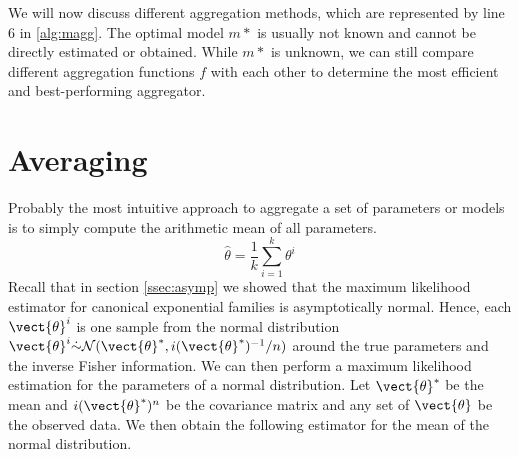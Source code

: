 We will now discuss different aggregation methods, which are represented by line 6 in \alg \ref{alg:magg}.
The optimal model $m*$ is usually not known and cannot be directly estimated or obtained.
While  $m*$ is unknown, we can still compare different aggregation functions $f$ with each other to determine the most efficient and best-performing aggregator.


\section{Averaging}

Probably the most intuitive approach to aggregate a set of parameters or models is to simply compute the  arithmetic mean of all parameters.
\begin{equation}
    \label{eq:arithmean}
    \hat{\theta} = \frac{1}{k} \sum_{i=1}^k \theta^i
\end{equation}
Recall that in section \ref{ssec:asymp} we showed that the maximum likelihood estimator for canonical exponential families is asymptotically normal.
Hence, each $\vect{\theta}^i$ is one sample from the normal distribution $\vect{\theta}^i \dot{\sim} \mathcal{N}(\vect{\theta}^*, i(\vect{\theta}^*)^{-1}/n)$ around the true parameters and the inverse Fisher information.
We can then perform a maximum likelihood estimation for the parameters of a normal distribution. 
Let $\vect{\theta}^*$ be the mean and $i(\vect{\theta}^*)^n$ be the covariance matrix and any set of $\vect{\theta}$ be the observed data.
We then obtain the following estimator for the mean of the normal distribution.
